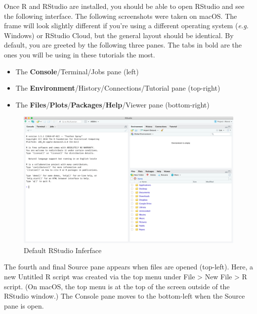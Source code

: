 \documentclass[
]{article}
\providecommand{\tightlist}{%
  \setlength{\itemsep}{0pt}\setlength{\parskip}{0pt}}
\begin{document}
Once R and RStudio are installed, you should be able to open RStudio and
see the following interface. The following screenshots were taken on
macOS. The frame will look slightly different if you're using a
different operating system (\emph{e.g.} Windows) or RStudio Cloud, but
the general layout should be identical. By default, you are greeted by
the following three panes. The tabs in bold are the ones you will be
using in these tutorials the most.

\begin{itemize}
\tightlist
\item
  The \textbf{Console}/Terminal/Jobs pane (left)
\item
  The \textbf{Environment}/History/Connections/Tutorial pane (top-right)
\item
  The
  \textbf{Files}/\textbf{Plots}/\textbf{Packages}/\textbf{Help}/Viewer
  pane (bottom-right)
\end{itemize}

\begin{figure}
\centering
\includegraphics{screenshots/3panes.png}
\caption{Default RStudio Inferface}
\end{figure}

The fourth and final Source pane appears when files are opened
(top-left). Here, a new Untitled R script was created via the top menu
under File \textgreater{} New File \textgreater{} R script. (On macOS,
the top menu is at the top of the screen outside of the RStudio window.)
The Console pane moves to the bottom-left when the Source pane is open.
\end{document}
